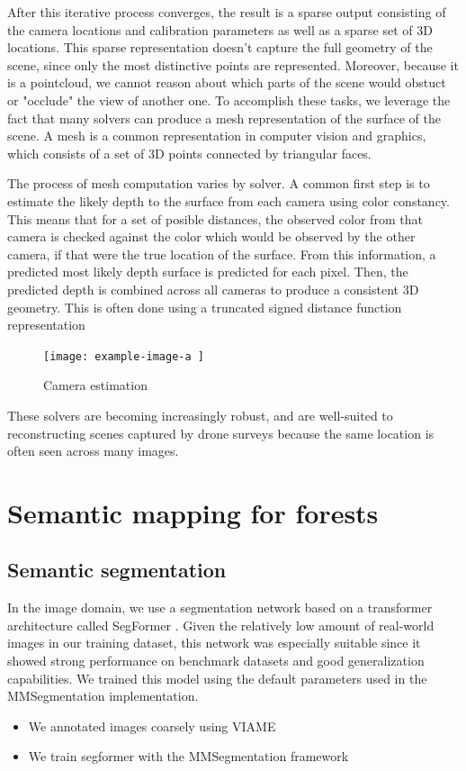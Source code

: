 \begin{itemize}
After this iterative process converges, the result is a sparse output consisting of the camera locations and calibration parameters as well as a sparse set of 3D locations. This sparse representation doesn't capture the full geometry of the scene, since only the most distinctive points are represented. Moreover, because it is a pointcloud, we cannot reason about which parts of the scene would obstuct or "occlude" the view of another one. To accomplish these tasks, we leverage the fact that many solvers can produce a mesh representation of the surface of the scene. A mesh is a common representation in computer vision and graphics, which consists of a set of 3D points connected by triangular faces. 

The process of mesh computation varies by solver. A common first step is to estimate the likely depth to the surface from each camera using color constancy. This means that for a set of posible distances, the observed color from that camera is checked against the color which would be observed by the other camera, if that were the true location of the surface. From this information, a predicted most likely depth surface is predicted for each pixel. Then, the predicted depth is combined across all cameras to produce a consistent 3D geometry. This is often done using a truncated signed distance function representation \cite{} 

\begin{figure}
    \centering
    \texttt{[image: example-image-a ]}
    \caption{Camera estimation}
    \label{fig:sparse-reconstruction}
\end{figure}

These solvers are becoming increasingly robust, and are well-suited to reconstructing scenes captured by drone surveys because the same location is often seen across many images.

\section{Semantic mapping for forests}
\end{itemize}
\subsection{Semantic segmentation}
In the image domain, we use a segmentation network based on a transformer architecture called SegFormer \cite{segformer21}. Given the relatively low amount of real-world images in our training dataset, this network was especially suitable since it showed strong performance on benchmark datasets and good generalization capabilities. We trained this model using the default parameters used in the MMSegmentation \cite{MMSegmentation} implementation. 
\begin{itemize}
    \item We annotated images coarsely using VIAME
    \item We train segformer with the MMSegmentation framework
\end{itemize}
    
